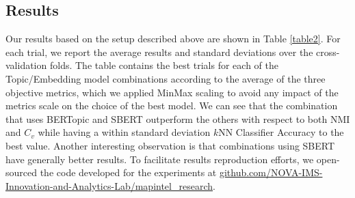 \documentclass[a4paper]{article}
\begin{document}
\subsection{Results}
Our results based on the setup described above are shown in Table \ref{table2}. For each trial, we report the average results and standard deviations over the cross-validation folds. The table contains the best trials for each of the Topic/Embedding model combinations according to the average of the three objective metrics, which we applied MinMax scaling to avoid any impact of the metrics scale on the choice of the best model. We can see that the combination that uses BERTopic and SBERT outperform the others with respect to both NMI and $C_v$ while having a within standard deviation $k$NN Classifier Accuracy to the best value. Another interesting observation is that combinations using SBERT have generally better results. To facilitate results reproduction efforts, we open-sourced the code developed for the experiments at \href{https://github.com/NOVA-IMS-Innovation-and-Analytics-Lab/mapintel_research}{github.com/NOVA-IMS-Innovation-and-Analytics-Lab/mapintel\_research}.

\begin{table}[H]
	\centering
	\caption{Hyperparameter tuning best trials per topic and embedding model according to the MinMax average of the multiple objective metrics.}
	\label{table2}
\end{table}
\end{document}
